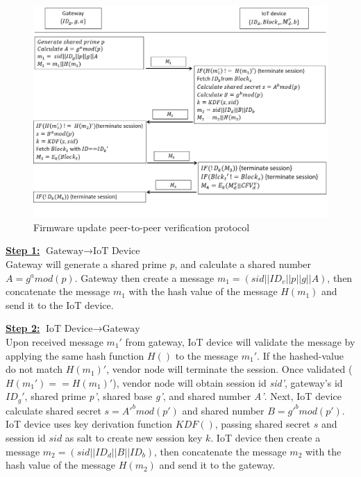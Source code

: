 \begin{figure}[H]
	\begin{center}
		\includegraphics[width=1.0\textwidth]{figures/firmware_update_execution_1.png}
		\caption{Firmware update peer-to-peer verification protocol} 
		\label{fig:executionprocessprotocol1}
	\end{center}
\end{figure}

\noindent \underline{\textbf{Step 1:}} $\text{Gateway}\rightarrow\text{IoT Device}$ \\
\indent Gateway will generate a shared prime \textit{p}, and calculate a shared number \textit{$A=g^a mod(p)$}. Gateway then create a message \textit{$m_1=(sid||ID_v||p||g||A)$}, then concatenate the message \textit{$m_1$} with the hash value of the message \textit{$H(m_1)$} and send it to the IoT device.

\noindent \underline{\textbf{Step 2:}} $\text{IoT Device}\rightarrow\text{Gateway}$ \\
\indent Upon received message \textit{$m_1'$} from gateway, IoT device will validate the message by applying the same hash function \textit{$H()$} to the message \textit{$m_1'$}. If the hashed-value do not match \textit{$H(m_1)'$}, vendor node will terminate the session. Once validated (\textit{$H(m_1')==H(m_1)'$}), vendor node will obtain session id \textit{sid'}, gateway's id \textit{$ID_g'$}, shared prime \textit{p'}, shared base \textit{g'}, and shared number \textit{A'}. Next, IoT device calculate shared secret \textit{$s=A'^bmod(p')$} and shared number \textit{$B=g'^bmod(p')$}. IoT device uses key derivation function \textit{$KDF()$}, passing shared secret \textit{$s$} and session id \textit{$sid$} as salt to create new session key \textit{$k$}. IoT device then create a message \textit{$m_2=(sid||ID_d||B||ID_b)$}, then concatenate the message \textit{$m_2$} with the hash value of the message \textit{$H(m_2)$} and send it to the gateway.


